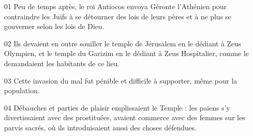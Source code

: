 01 Peu de temps après, le roi Antiocos envoya Géronte l’Athénien pour contraindre les Juifs à se détourner des lois de leurs pères et à ne plus se gouverner selon les lois de Dieu.

02 Ils devaient en outre souiller le temple de Jérusalem en le dédiant à Zeus Olympien, et le temple du Garizim en le dédiant à Zeus Hospitalier, comme le demandaient les habitants de ce lieu.

03 Cette invasion du mal fut pénible et difficile à supporter, même pour la population.

04 Débauches et parties de plaisir emplissaient le Temple : les païens s’y divertissaient avec des prostituées, avaient commerce avec des femmes sur les parvis sacrés, où ils introduisaient aussi des choses défendues.
